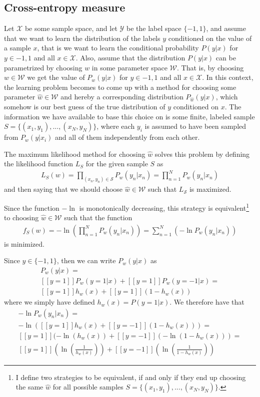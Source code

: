 \subsection{Cross-entropy measure}

Let $\mathcal{X}$ be some sample space, and let $\mathcal{Y}$ be the label space $\{-1,1\}$, and assume that we want to learn the distribution of the labels $y$ conditioned on the value of a sample $x$, that is we want to learn the conditional probability $P(y|x)$ for $y \in {-1,1}$ and all $x\in \mathcal{X}$. Also, assume that the distribution $P(y|x)$ can be parametrized by choosing $w$ in some parameter space $\mathcal{W}$. That is, by choosing $w \in \mathcal{W}$ we get the value of $P_w(y|x)$ for $y \in {-1,1}$ and all $x\in \mathcal{X}$. In this context, the learning problem becomes to come up with a method for choosing some parameter $\hat{w} \in \mathcal{W}$ and hereby a corresponding distribution $P_{\hat{w}}(y|x)$, which somehow is our best guess of the true distribution of $y$ conditioned on $x$. The information we have available to base this choice on is some finite, labeled sample $S = \{(x_1,y_1),...,(x_N,y_N)\}$, where each $y_i$ is assumed to have been sampled from $P_w(y|x_i)$ and all of them independently from each other.

The maximum likelihood method for choosing $\hat{w}$ solves this problem by defining the likelihood function $L_S$ for the given sample $S$ as
\begin{align}
L_S(w) = \prod_{(x_n,y_n)\in \mathcal{S}}  P_w(y_n|x_n)
= \prod_{n=1}^N P_w(y_n|x_n)
\end{align}
and then saying that we should choose $\hat{w} \in \mathcal{W}$ such that $L_\mathcal{S}$ is maximized.

Since the function $-\ln$ is monotonically decreasing, this strategy is equivalent\footnote{I define two strategies to be equivalent, if and only if they end up choosing the same $\hat{w}$ for all possible samples $S = \{(x_1,y_1),...,(x_N,y_N)\}$.} to choosing $\hat{w} \in \mathcal{W}$ such that the function
\begin{align}
f_S(w) = -\ln \left( \prod_{n=1}^N P_w(y_n|x_n) \right) = \sum_{n=1}^N \left( - \ln P_w(y_n|x_n) \right)
\end{align}
is minimized. 

Since $y \in \{-1,1\}$, then we can write $P_w(y|x)$ as
\begin{align}
P_w(y|x)  = \\ 
[[y = 1]] P_w(y = 1|x) + [[y = 1]] P_w(y = -1|x) = \\ 
[[y = 1]] h_w(x) + [[y = 1]] (1 - h_w(x))
\end{align}
where we simply have defined $h_w(x) = P(y = 1 | x)$. We therefore have that
\begin{align}
- \ln P_w(y_n|x_n) = \\ 
-\ln ([[y = 1]] h_w(x) + [[y = -1]] (1 - h_w(x))) = \\ 
[[y = 1]](-\ln (h_w(x)) + [[y = -1]](-\ln (1 - h_w(x))) = \\ 
[[y = 1]]\left(\ln \left( \frac{1}{h_w(x)}\right)\right) + [[y = -1]]\left(\ln \left( \frac{1}{1 - h_w(x)}\right)\right)
\end{align}

